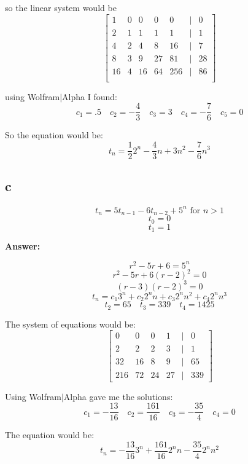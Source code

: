 \documentclass[12pt]{report}
\begin{document}
so the linear system would be
$$ \begin{bmatrix}
    1 & 0 & 0 & 0 & 0 & | & 0 \\
    2 & 1 & 1 & 1 & 1 & | & 1 \\
    4 & 2 & 4 & 8 & 16 & | & 7 \\
    8 & 3 & 9 & 27 & 81 & | & 28 \\
    16 & 4 & 16 & 64 & 256 & | & 86 \\  
\end{bmatrix} $$

using Wolfram$\vert$Alpha I found:
$$ c_1 = .5 \quad c_2 = -\frac{4}{3} \quad c_3 = 3 \quad c_4 = -\frac{7}{6} \quad c_5 = 0 $$

So the equation would be:
$$ t_n = \frac{1}{2}2^n - \frac{4}{3}n + 3n^2 - \frac{7}{6}n^3 $$

\subsection*{{c}}

$$ t_n = 5t_{n-1} - 6t_{n-2} + 5^n \text{ for } n > 1 $$
$$ t_0 = 0 $$
$$ t_1 = 1 $$

\textbf{Answer:}

$$ r^2 - 5r + 6 = 5^n $$
$$ r^2 - 5r + 6 (r-2)^2 = 0 $$
$$ (r-3)(r-2)^3 = 0 $$
$$ t_n = c_1 3^n + c_2 2^n n + c_3 2^n n^2 + c_4 2^n n^3 $$
$$ t_2 = 65 \quad t_3 = 339 \quad t_4 = 1425 $$

The system of equations would be:
$$ \begin{bmatrix}
    0 & 0 & 0 & 1 & | & 0 \\
    2 & 2 & 2 & 3 & | & 1 \\
    32 & 16 & 8 & 9 & | & 65 \\
    216 & 72 & 24 & 27 & | & 339 
\end{bmatrix} $$

Using Wolfram$\vert$Alpha gave me the solutions:
$$ c_1 = -\frac{13}{16} \quad c_2 = \frac{161}{16} \quad c_3 = -\frac{35}{4} \quad c_4 = 0 $$

The equation would be:
$$ t_n = -\frac{13}{16} 3^n + \frac{161}{16} 2^n n - \frac{35}{4} 2^n n^2 $$
\end{document}
